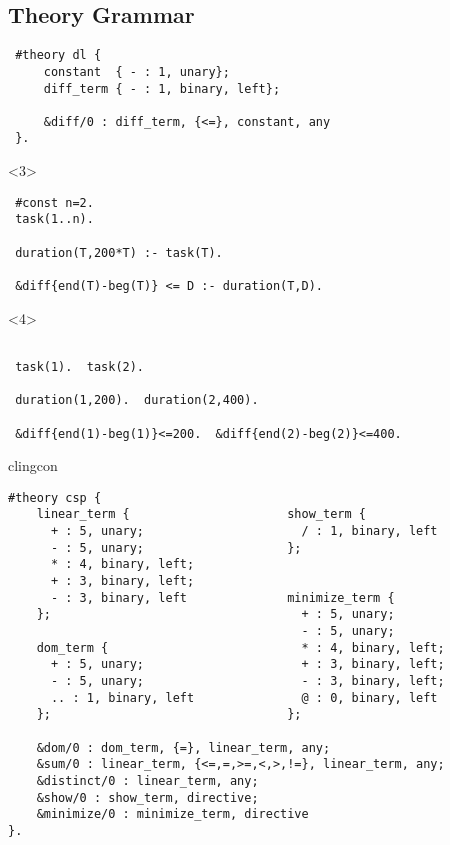 \documentclass[t,fleqn]{beamer}
\begin{document}
\subsection{Theory Grammar}
\begin{frame}[fragile]{\clingo[DL]}
  \small
\begin{lstlisting}
 #theory dl {
     constant  { - : 1, unary};
     diff_term { - : 1, binary, left};

     &diff/0 : diff_term, {<=}, constant, any
 }.    
\end{lstlisting}

  \begin{onlyenv}<3>
\begin{lstlisting}
 #const n=2. 
 task(1..n).  

 duration(T,200*T) :- task(T). 

 &diff{end(T)-beg(T)} <= D :- duration(T,D). 
\end{lstlisting}
  \end{onlyenv}
  \begin{onlyenv}<4>
\begin{lstlisting}

 task(1).  task(2).   

 duration(1,200).  duration(2,400).

 &diff{end(1)-beg(1)}<=200.  &diff{end(2)-beg(2)}<=400.
\end{lstlisting}
  \end{onlyenv}
\end{frame}
\begin{frame}[fragile,shrink=1]{clingcon}
\begin{lstlisting}
#theory csp {
    linear_term {                      show_term {            
      + : 5, unary;                      / : 1, binary, left  
      - : 5, unary;                    };                     
      * : 4, binary, left;             
      + : 3, binary, left;             
      - : 3, binary, left              minimize_term {        
    };                                   + : 5, unary;        
                                         - : 5, unary;        
    dom_term {                           * : 4, binary, left; 
      + : 5, unary;                      + : 3, binary, left; 
      - : 5, unary;                      - : 3, binary, left; 
      .. : 1, binary, left               @ : 0, binary, left  
    };                                 };                     

    &dom/0 : dom_term, {=}, linear_term, any;
    &sum/0 : linear_term, {<=,=,>=,<,>,!=}, linear_term, any;
    &distinct/0 : linear_term, any;
    &show/0 : show_term, directive;
    &minimize/0 : minimize_term, directive
}.    
\end{lstlisting}
\end{frame}
\end{document}
